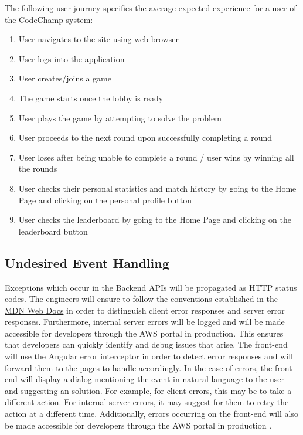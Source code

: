 \documentclass[12pt, titlepage]{article}
\begin{document}
The following user journey specifies the average expected experience for a user of the CodeChamp system:
\begin{enumerate}
    \item User navigates to the site using web browser
    \item User logs into the application
    \item User creates/joins a game
    \item The game starts once the lobby is ready
    \item User plays the game by attempting to solve the problem
    \item User proceeds to the next round upon successfully completing a round
    \item User loses after being unable to complete a round / user wins by winning all the rounds
    \item User checks their personal statistics and match history by going to the Home Page and clicking on the personal profile button
    \item User checks the leaderboard by going to the Home Page and clicking on the leaderboard button
\end{enumerate}

\subsection{Undesired Event Handling}
Exceptions which occur in the Backend APIs will be propagated as HTTP status codes. The engineers will ensure to follow the conventions established in the \href{https://developer.mozilla.org/en-US/docs/Web/HTTP/Status}{MDN Web Docs} in order to distinguish client error responses and server error responses. Furthermore, internal server errors will be logged and will be made accessible for developers through the AWS portal in production. This ensures that developers can quickly identify and debug issues that arise. The front-end will use the Angular error interceptor in order to detect error responses and will forward them to the pages to handle accordingly. In the case of errors, the front-end will display a dialog mentioning the event in natural language to the user and suggesting an solution. For example, for client errors, this may be to take a different action. For internal server errors, it may suggest for them to retry the action at a different time. Additionally, errors occurring on the front-end will also be made accessible for developers through the AWS portal in production .
\end{document}
